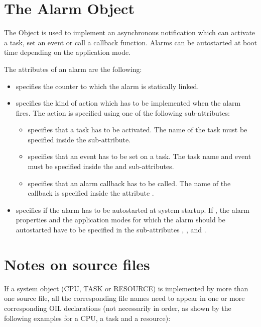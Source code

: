 \section{The Alarm Object}

The  Object is used to implement an asynchronous
notification which can activate a task, set an event or call a
callback function. Alarms can be autostarted at boot time depending on
the application mode.

The attributes of an alarm are the following:
\begin{itemize}
\item {} specifies the counter to which the alarm is
  statically linked.
\item {} specifies the kind of action which has to be
  implemented when the alarm fires. The action is specified using one
  of the following sub-attributes:
  \begin{itemize}
  \item {} specifies that a task has to be
    activated. The name of the task must be specified inside the
     sub-attribute.
  \item {} specifies that an event has to be set on a
    task. The task name and event must be specified inside the
     and  sub-attributes.
  \item {} specifies that an alarm callback has to
    be called. The name of the callback is specified inside the
    attribute .
  \end{itemize}
\item {} specifies if the alarm has to be autostarted
  at system startup. If , the alarm properties and the
  application modes for which the alarm should be autostarted have to be
  specified in the sub-attributes , ,
  and .
\end{itemize}

\section{Notes on source files}

If a system object (CPU, TASK or RESOURCE) is implemented by more than
one source file, all the corresponding file names need to appear in
one or more corresponding OIL declarations (not necessarily in order,
as shown by the following examples for a CPU, a task and a resource):

